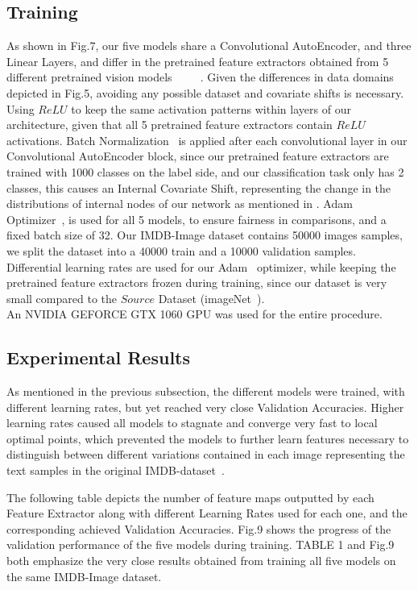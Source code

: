 \documentclass[conference]{IEEEtran}
\begin{document}
\subsection{Training}
            As shown in Fig.7, our five models share a Convolutional AutoEncoder, and three Linear Layers, and differ in the pretrained feature extractors obtained from 5 different pretrained vision models~\cite{alexnet}~\cite{shufflenetv2}~\cite{vgg16}~\cite{resnet}~\cite{resnext}. Given the differences in data domains depicted in Fig.5, avoiding any possible dataset and covariate shifts is necessary. Using $ReLU$ to keep the same activation patterns within layers of our architecture, given that all 5 pretrained feature extractors contain $ReLU$ activations. Batch Normalization~\cite{batchnorm} is applied after each convolutional layer in our Convolutional AutoEncoder block, since our pretrained feature extractors are trained with 1000 classes on the label side, and our classification task only has 2 classes, this causes an Internal Covariate Shift, representing the change in the distributions of internal nodes of our network as mentioned in \cite{batchnorm}. Adam Optimizer~\cite{Adam}, is used for all 5 models, to ensure fairness in comparisons, and a fixed batch size of 32. Our IMDB-Image dataset contains 50000 images samples,
            we split the dataset into a 40000 train and a 10000 validation samples. Differential learning rates are used for our Adam~\cite{Adam} optimizer, while keeping the pretrained feature extractors frozen during training, since our dataset is very small compared to the $Source$ Dataset (imageNet~\cite{imagenet}).\\
			An NVIDIA GEFORCE GTX 1060 GPU was used for the entire procedure. 
\subsection{Experimental Results}
			As mentioned in the previous subsection, the different models were trained,
			with different learning rates, but yet reached very close Validation Accuracies. Higher learning rates caused all models to stagnate and converge very fast to local optimal points, which prevented the models to further learn features necessary to distinguish between different variations contained in each image representing the text samples in the original IMDB-dataset~\cite{imdb}.
			
			The following table depicts the number of feature maps outputted by each Feature Extractor along with different Learning Rates used for each one, and the corresponding achieved Validation Accuracies. Fig.9 shows the progress of the validation performance of the five models during training.
            TABLE 1 and Fig.9 both emphasize the very close results obtained from training all five models on the same IMDB-Image dataset.
        
\end{document}
